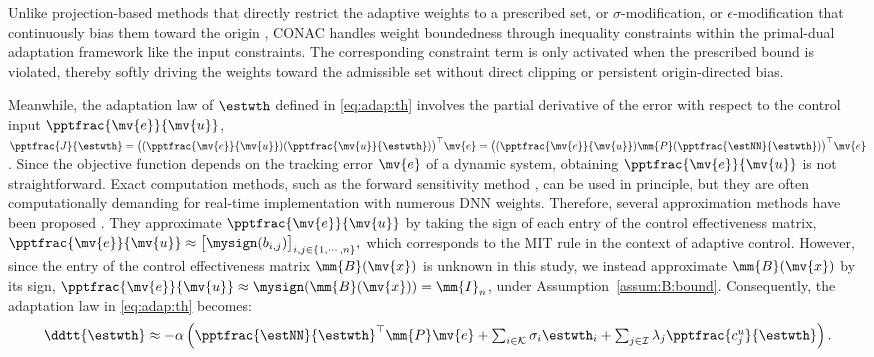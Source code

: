 \documentclass[letterpaper, journal]{IEEEtran}
\begin{document}
\begin{remark} \label{rem:weight:bound}
  Unlike projection-based methods that directly restrict the adaptive weights to a prescribed set, or $\sigma$-modification, or $\epsilon$-modification that continuously bias them toward the origin \cite{Ryu:2025ab}, CONAC handles weight boundedness through inequality constraints within the primal-dual adaptation framework like the input constraints.
  The corresponding constraint term is only activated when the prescribed bound is violated, thereby softly driving the weights toward the admissible set without direct clipping or persistent origin-directed bias.
\end{remark}

Meanwhile, the adaptation law of $\estwth$ defined in \eqref{eq:adap:th} involves the partial derivative of the error with respect to the control input $\pptfrac{\mv{e}}{\mv{u}}$, \ie 
$
    \pptfrac{J}{\estwth}
    =
    \big(
        (\pptfrac{\mv{e}}{\mv{u}})
        (\pptfrac{\mv{u}}{\estwth})
    \big)
    ^\top \mv{e}
    =
    \big(
        (\pptfrac{\mv{e}}{\mv{u}})
        \mm{P}
        (\pptfrac{\estNN}{\estwth})
    \big)
    ^\top \mv{e}
$. 
Since the objective function depends on the tracking error $\mv{e}$ of a dynamic system, obtaining $\pptfrac{\mv{e}}{\mv{u}}$ is not straightforward. 
Exact computation methods, such as the forward sensitivity method \cite{Khalil:2002aa,Ryu:2025ab}, can be used in principle, but they are often computationally demanding for real-time implementation with numerous DNN weights.
Therefore, several approximation methods have been proposed \cite{Douratsos:2007aa,Saerens:1991aa}.
They approximate $\pptfrac{\mv{e}}{\mv{u}}$ by taking the sign of each entry of the control effectiveness matrix, \ie
$
  \pptfrac{\mv{e}}{\mv{u}}
  \approx
  \big[
    \mysign
    (
    b_{i,j}
    )
  \big]_{i,j\in\{1,\cdots,n\}}
  ,
$
which corresponds to the MIT rule in the context of adaptive control.
However, since the entry of the control effectiveness matrix $\mm{B}(\mv{x})$ is unknown in this study, we instead approximate $\mm{B}(\mv{x})$ by its sign, \ie $\pptfrac{\mv{e}}{\mv{u}}\approx\mysign(\mm{B}(\mv{x}))=\mm{I}_{n}$, under Assumption~\ref{assum:B:bound}.
Consequently, the adaptation law in \eqref{eq:adap:th} becomes:
\begin{equation}
  \ddtt{\estwth}
  \approx
  -\alpha 
  \left(
    {\pptfrac{\estNN}
    {\estwth}}^\top
    \mm{P}
    \mv{e}
    +
    \textstyle\sum_{i\in\mathcal{K}}
    \sigma_i 
    \estwth_i
    +
    \textstyle\sum_{j\in\mathcal{I}}
    \lambda_j 
    \pptfrac{c^{u}_{j}}{\estwth}
  \right)
  .
  \label{eq:adap:th:approx}
\end{equation}
\end{document}
